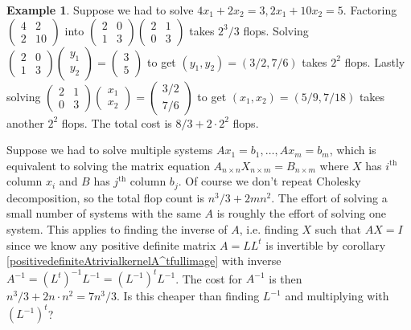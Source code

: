 \documentclass[12pt]{amsart}
\theoremstyle{definition}
\newtheorem{example}[theorem]{Example}
\begin{document}
\begin{example} Suppose we had to solve $4x_1 + 2x_2 = 3, 2x_1 + 10x_2 = 5$. Factoring $\left(\begin{array}{cc} 4 & 2 \\ 2 & 10 \end{array}\right)$ into $\left(\begin{array}{cc} 2 & 0 \\ 1 & 3 \end{array}\right)\left(\begin{array}{cc} 2 & 1 \\ 0 & 3 \end{array}\right)$ takes $2^3/3$ flops. Solving $\left(\begin{array}{cc} 2 & 0 \\ 1 & 3 \end{array}\right)\left(\begin{array}{c} y_1 \\ y_2 \end{array}\right) = \left(\begin{array}{c} 3 \\ 5 \end{array}\right)$ to get $(y_1, y_2) = (3/2,7/6)$ takes $2^2$ flops. Lastly solving $\left(\begin{array}{cc} 2 & 1 \\ 0 & 3 \end{array}\right)\left(\begin{array}{c} x_1 \\ x_2 \end{array}\right) = \left(\begin{array}{c} 3/2 \\ 7/6 \end{array}\right)$ to get $(x_1, x_2) = (5/9,7/18)$ takes another $2^2$ flops. The total cost is $8/3 + 2 \cdot 2^2$ flops.
\end{example}

Suppose we had to solve multiple systems $Ax_1 = b_1, \dots , Ax_m = b_m$, which is equivalent to solving the matrix equation $A_{n \times n}X_{n \times m} = B_{n \times m}$ where $X$ has $i^{\text{th}}$ column $x_i$ and $B$ has $j^{\text{th}}$ column $b_j$. Of course we don't repeat Cholesky decomposition, so the total flop count is $n^3/3 + 2mn^2$. The effort of solving a small number of systems with the same $A$ is roughly the effort of solving one system. This applies to finding the inverse of $A$, i.e. finding $X$ such that $AX = I$ since we know any positive definite matrix $A = LL^t$ is invertible by corollary \ref{positivedefiniteAtrivialkernelA^tfullimage} with inverse $A^{-1} = (L^t)^{-1}L^{-1} = (L^{-1})^tL^{-1}$. The cost for $A^{-1}$ is then $n^3/3 + 2n \cdot n^2 = 7n^3/3$. Is this cheaper than finding $L^{-1}$ and multiplying with $(L^{-1})^t$?
\end{document}
